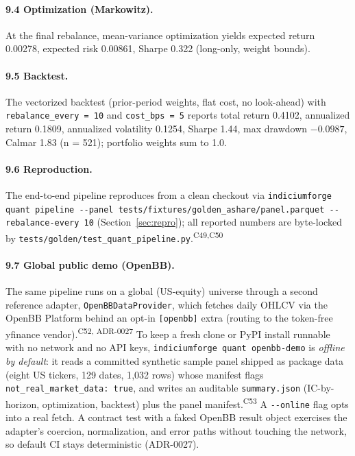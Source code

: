 \documentclass[11pt]{article}
\newcommand{\claim}[1]{\textsuperscript{\textsf{#1}}}
\begin{document}
\paragraph{9.4 Optimization (Markowitz).}
At the final rebalance, mean-variance optimization yields expected return 0.00278, expected
risk 0.00861, Sharpe 0.322 (long-only, weight bounds).

\paragraph{9.5 Backtest.}
The vectorized backtest
(prior-period weights, flat cost, no look-ahead) with \texttt{rebalance\_every = 10} and
\texttt{cost\_bps = 5} reports total return 0.4102, annualized return 0.1809, annualized
volatility 0.1254, Sharpe 1.44, max drawdown $-0.0987$, Calmar 1.83 (n = 521); portfolio
weights sum to 1.0.

\paragraph{9.6 Reproduction.}
The end-to-end pipeline reproduces from a clean checkout via
\verb|indiciumforge quant pipeline --panel tests/fixtures/golden_ashare/panel.parquet --rebalance-every 10|
(Section~\ref{sec:repro}); all reported numbers are byte-locked by
\texttt{tests/golden/test\_quant\_pipeline.py}.\claim{C49,C50}

\paragraph{9.7 Global public demo (OpenBB).}
The same pipeline runs on a global (US-equity) universe through a second reference adapter,
\texttt{OpenBBDataProvider}, which fetches daily OHLCV via the OpenBB
Platform behind an opt-in \texttt{[openbb]} extra (routing to the token-free yfinance
vendor).\claim{C52, ADR-0027} To keep a fresh clone or PyPI install runnable with no network
and no API keys, \texttt{indiciumforge quant openbb-demo} is \emph{offline by default}: it
reads a committed synthetic sample panel shipped as package data (eight US tickers, 129
dates, 1{,}032 rows) whose manifest flags \texttt{not\_real\_market\_data:\ true}, and writes
an auditable \texttt{summary.json} (IC-by-horizon, optimization, backtest) plus the panel
manifest.\claim{C53} A \texttt{-{}-online} flag opts into a real fetch. A contract test with a
faked OpenBB result object exercises the adapter's coercion, normalization, and error paths
without touching the network, so default CI stays deterministic (ADR-0027).
\end{document}
